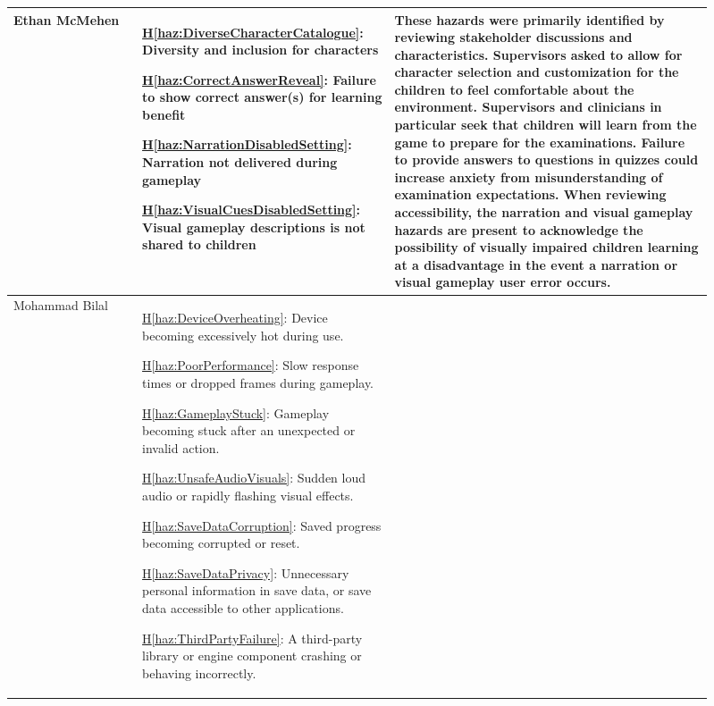 \documentclass{article}
\newcounter{hazard}
\newcommand{\hazref}[1]{\hyperref[haz:#1]{H\ref*{haz:#1}}}
\begin{document}
\begin{enumerate}
\begin{longtable}{@{}
        p{0.17\linewidth}
        p{0.32\linewidth}
        p{0.42\linewidth}
    @{}}
    Ethan McMehen &
    \hazref{DiverseCharacterCatalogue}: Diversity and inclusion for characters

    \hazref{CorrectAnswerReveal}: Failure to show correct answer(s) for learning benefit

    \hazref{NarrationDisabledSetting}: Narration not delivered during gameplay

    \hazref{VisualCuesDisabledSetting}: Visual gameplay descriptions is not shared to children
    &
    These hazards were primarily identified by reviewing stakeholder discussions 
    and characteristics. Supervisors asked to allow for character selection and 
    customization for the children to feel comfortable about the environment. 
    Supervisors and clinicians in particular seek that children will learn from 
    the game to prepare for the examinations. Failure to provide answers to questions in
    quizzes could increase anxiety from misunderstanding of examination expectations. 
    When reviewing accessibility, the narration and visual gameplay hazards are present 
    to acknowledge the possibility of visually impaired children learning at a disadvantage 
    in the event a narration or visual gameplay user error occurs.  \\
    \midrule

    Mohammad Bilal &
    \hazref{DeviceOverheating}: Device becoming excessively
    hot during use.

    \hazref{PoorPerformance}: Slow response times or dropped
    frames during gameplay.

    \hazref{GameplayStuck}: Gameplay becoming stuck after an
    unexpected or invalid action.

    \hazref{UnsafeAudioVisuals}: Sudden loud audio or rapidly
    flashing visual effects.

    \hazref{SaveDataCorruption}: Saved progress becoming
    corrupted or reset.

    \hazref{SaveDataPrivacy}: Unnecessary personal information
    in save data, or save data accessible to other applications.

    \hazref{ThirdPartyFailure}: A third-party library or engine
    component crashing or behaving incorrectly.


\end{longtable}
\end{enumerate}
\end{document}
